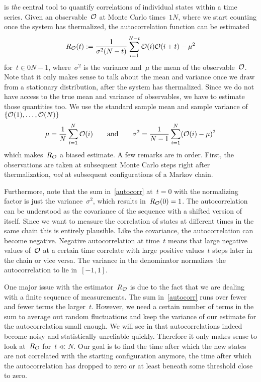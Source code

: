  is \emph{the} central tool to quantify correlations of
individual states within a time series. Given an observable~$\mathcal{O}$ at Monte Carlo
times~$\numlist{1}{N}$, where we start counting once the system has thermalized,
the autocorrelation function can be estimated
%
\begin{equation}\label{autocorr}
  R_{\mathcal{O}}(t) := \frac{1}{\sigma^2 (N-t)} \sum_{i = 1}^{N-t}
    \mathcal{O}(i) \mathcal{O}(i+t) - \mu^2
\end{equation}
%
for~$t \in \numlist{0}{N-1}$, where~$\sigma^2$ is the variance and~$\mu$ the
mean of the observable~$\mathcal{O}$. Note that it only makes sense to talk about the
mean and variance once we draw from a stationary distribution, \ie{} after the
system has thermalized. Since we do not have access to the true mean and
variance of observables, we have to estimate those quantities too. We use the
standard sample mean and sample variance of~$\{\mathcal{O}(1),\dots,\mathcal{O}(N)\}$
%
\begin{equation}\label{samplemeanvar}
  \mu = \frac{1}{N} \sum_{i=1}^N \mathcal{O}(i) \qquad\text{and}\qquad
  \sigma^2 = \frac{1}{N-1} \sum_{i=1}^N (\mathcal{O}(i) - \mu)^2
\end{equation}
%
which makes~$R_{\mathcal{O}}$ a biased estimate. A few remarks are in order. First, the
observations are taken at subsequent Monte Carlo steps right after
thermalization, \emph{not} at subsequent configurations of a Markov chain.

Furthermore, note that the sum in~\eqref{autocorr} at~$t=0$ with the normalizing
factor is just the variance~$\sigma^2$, which results in~$R_{\mathcal{O}}(0) = 1$. The
autocorrelation can be understood as the covariance of the sequence with a
shifted version of itself. Since we want to measure the correlation of states at
different times in the same chain this is entirely plausible. Like the
covariance, the autocorrelation can become negative. Negative autocorrelation at
time~$t$ means that large negative values of~$\mathcal{O}$ at a certain time correlate
with large positive values~$t$ steps later in the chain or vice versa. The
variance in the denominator normalizes the autocorrelation to lie in~$[-1,1]$.

One major issue with the estimator~$R_{\mathcal{O}}$ is due to the fact that we are
dealing with a finite sequence of measurements. The sum in~\eqref{autocorr} runs
over fewer and fewer terms the larger~$t$. However, we need a certain number of
terms in the sum to average out random fluctuations and keep the variance of our
estimate for the autocorrelation small enough. We will see in
 that autocorrelations indeed become noisy and statistically
unreliable quickly. Therefore it only makes sense to look at~$R_{\mathcal{O}}$ for~$t
\ll N$. Our goal is to find the time after which the new states are not
correlated with the starting configuration anymore, \ie{} the time after which
the autocorrelation has dropped to zero or at least beneath some threshold close
to zero.

